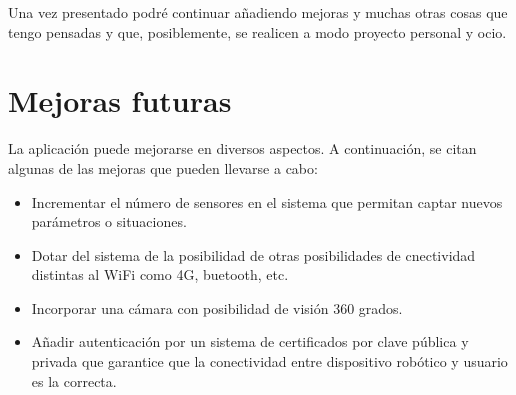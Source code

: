 Una vez presentado podré continuar añadiendo mejoras y muchas otras cosas que tengo pensadas y que, posiblemente, se realicen a modo proyecto personal y ocio.\\

\section{Mejoras futuras}

La aplicación puede mejorarse en diversos aspectos. A continuación, se citan algunas de las mejoras que pueden llevarse a cabo:

\begin{itemize}
  \item Incrementar el número de sensores en el sistema que permitan captar nuevos parámetros o situaciones.
  \item Dotar del sistema de la posibilidad de otras posibilidades de cnectividad distintas al WiFi como 4G, buetooth, etc.
  \item Incorporar una cámara con posibilidad de visión 360 grados.
  \item Añadir autenticación por un sistema de certificados por clave pública y privada que garantice que la conectividad entre dispositivo robótico y usuario es la correcta.
\end{itemize}

